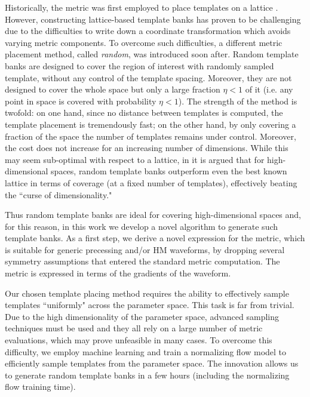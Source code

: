 \documentclass[twocolumn,showpacs,preprintnumbers,nofootinbib,prd,
superscriptaddress,10pt]{revtex4-2}
\begin{document}
Historically, the metric was first employed to place templates on a lattice \cite{owen_metric, Prix:2007ks}. However, constructing lattice-based template banks has proven to be challenging due to the difficulties to write down a coordinate transformation which avoids varying metric components.
To overcome such difficulties, a different metric placement method, called {\it random}, was introduced \cite{Messenger:2008ta} soon after.
Random template banks are designed to cover the region of interest with randomly sampled template, without any control of the template spacing. 
Moreover, they are not designed to cover the whole space but only a large fraction $\eta<1$ of it (i.e. any point in space is covered with probability $\eta<1$).
The strength of the method is twofold: on one hand, since no distance between templates is computed, the template placement is tremendously fast; on the other hand, by only covering a fraction of the space the number of templates remains under control.
Moreover, the cost does not increase for an increasing number of dimensions.
While this may seem sub-optimal with respect to a lattice, in \cite{Messenger:2008ta, Allen:2022lqr, Allen:2021yuy} it is argued that for high-dimensional spaces, random template banks outperform even the best known lattice in terms of coverage (at a fixed number of templates), effectively beating the ``curse of dimensionality."

Thus random template banks are ideal for covering high-dimensional spaces and, for this reason, in this work we develop a novel algorithm to generate such template banks. As a first step, we derive a novel expression for the metric, which is suitable for generic precessing and/or HM waveforms, by dropping several symmetry assumptions that entered the standard metric computation. The metric is expressed in terms of the gradients of the waveform.

Our chosen template placing method requires the ability to effectively sample templates ``uniformly" across the parameter space.
This task is far from trivial. Due to the high dimensionality of the parameter space, advanced sampling techniques must be used and they all rely on a large number of metric evaluations, which may prove unfeasible in many cases. To overcome this difficulty, we employ machine learning and train a normalizing flow model to efficiently sample templates from the parameter space. The innovation allows us to generate random template banks in a few hours (including the normalizing flow training time).
\end{document}
